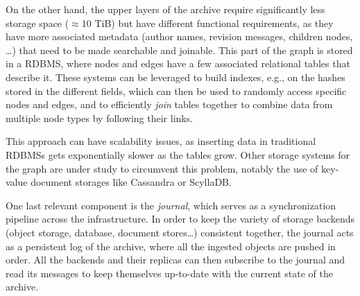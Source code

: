 On the other hand, the upper layers of the archive require significantly less
storage space ($\approx 10$ TiB) but have different functional requirements, as
they have more associated metadata (author names, revision messages, children
nodes, …) that need to be made searchable and joinable. This part of the graph
is stored in a \gls{RDBMS}, where nodes and edges have a few associated
relational tables that describe it. These systems can be leveraged to build
indexes, e.g., on the hashes stored in the different fields, which can then be
used to randomly access specific nodes and edges, and to efficiently
\emph{join} tables together to combine data from multiple node types by
following their links.

This approach can have scalability issues, as inserting data in traditional
\glspl{RDBMS} gets exponentially slower as the tables grow.  Other storage
systems for the graph are under study to circumvent this problem, notably the
use of key-value document storages like Cassandra or ScyllaDB.

One last relevant component is the \emph{journal}, which serves as a
synchronization pipeline across the infrastructure. In order to keep the
variety of storage backends (object storage, database, document stores…)
consistent together, the journal acts as a persistent log of the archive, where
all the ingested objects are pushed in order. All the backends and their
replicas can then subscribe to the journal and read its messages to keep
themselves up-to-date with the current state of the archive.
